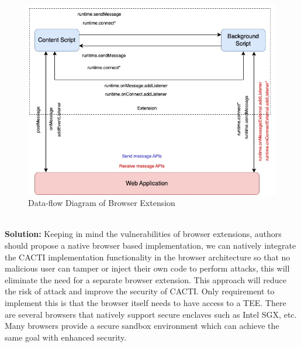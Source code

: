 \begin{enumerate}
	\begin{figure}[h]
		\centering
		\includegraphics[scale=0.5]{./imgs/browser_extensio_flow.jpg}
		\caption{Data-flow Diagram of Browser Extension \cite{ref2}}
		\label{fig:browserfig}
	\end{figure}

	\textbf{\\Solution:} Keeping in mind the vulnerabilities of browser extensions, authors should propose a native browser based implementation, we can natively integrate the CACTI implementation functionality in the browser architecture so that no malicious user can tamper or inject their own code to perform attacks, this will eliminate the need for a separate browser extension. This approach will reduce the risk of attack and improve the security of CACTI. Only requirement to implement this is that the browser itself needs to have access to a TEE. There are several browsers that natively support secure enclaves such as Intel SGX, etc. Many browsers provide a secure sandbox environment which can achieve the same goal with enhanced security.\\


\end{enumerate}
